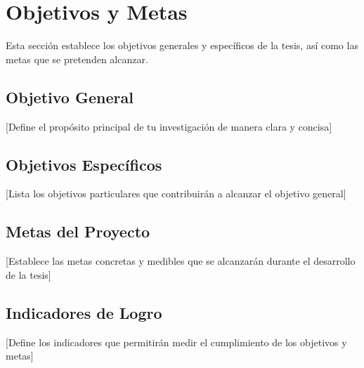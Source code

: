 \section{Objetivos y Metas}

Esta sección establece los objetivos generales y específicos de la tesis, así como las metas que se pretenden alcanzar.

\subsection{Objetivo General}
[Define el propósito principal de tu investigación de manera clara y concisa]

\subsection{Objetivos Específicos}
[Lista los objetivos particulares que contribuirán a alcanzar el objetivo general]

\subsection{Metas del Proyecto}
[Establece las metas concretas y medibles que se alcanzarán durante el desarrollo de la tesis]

\subsection{Indicadores de Logro}
[Define los indicadores que permitirán medir el cumplimiento de los objetivos y metas]